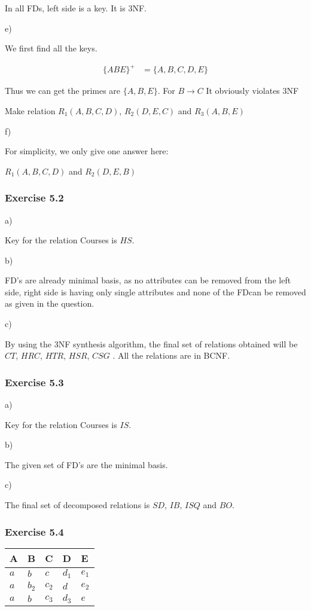 \documentclass[../../main.tex]{subfiles}
\begin{document}
In all FDs, left side is a key. It is 3NF.

e)

We first find all the keys.

\begin{align*}
  \{ABE\}^{+} &= \{A,B,C,D,E\}
\end{align*}

Thus we can get the primes are $\{A, B, E\}$. For $B \to C$
It obviously violates 3NF

Make relation $R_{1}(A,B,C,D)$, $R_{2}(D, E, C)$ and $R_{3}(A, B, E)$

f)

For simplicity, we only give one answer here:

$R_{1}(A,B,C,D)$ and $R_{2}(D, E, B)$

\subsubsection*{Exercise 5.2}

a)

Key for the relation Courses is $HS$.

b)

FD's are already minimal basis, as no attributes can be removed
from the left side, right side is having only single
attributes and none of the FDcan be removed as given in the question.

c)

By using the 3NF synthesis algorithm, the final set of relations obtained will
be $CT$, $HRC$, $HTR$, $HSR$, $CSG$ . All the relations are in BCNF.


\subsubsection*{Exercise 5.3}

a)

Key for the relation Courses is $IS$.

b)

The given set of FD's are the minimal basis.

c)

The final set of decomposed relations is
$SD$, $IB$, $ISQ$ and $BO$.

\subsubsection*{Exercise 5.4}

\begin{table}[H]
  \centering
  \begin{tabular}{@{}lllll@{}}
  \toprule
  A & B & C & D & E \\ \midrule
  $a$     & $b$      & $c$     & $d_{1}$ & $e_{1}$  \\
  $a$     & $b_{2}$  & $c_{2}$ & $d$     & $e_{2}$  \\
  $a$     & $b$      & $c_{3}$ & $d_{3}$ & $e$      \\ \bottomrule
  \end{tabular}
\end{table}
\end{document}
